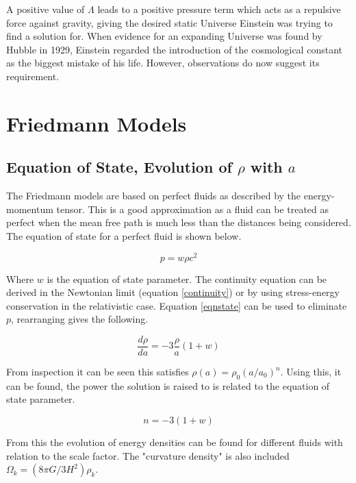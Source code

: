 \documentclass[12pt]{article} %
\begin{document}
A positive value of $\Lambda$ leads to a positive pressure term which acts as a repulsive force against gravity, giving the desired static Universe Einstein was trying to find a solution for. When evidence for an expanding Universe was found by Hubble in 1929, Einstein regarded the introduction of the cosmological constant as the biggest mistake of his life. However, observations do now suggest its requirement\cite{coles}.

\section{Friedmann Models}

\subsection{Equation of State, Evolution of $\rho$ with $a$}

The Friedmann models are based on perfect fluids as described by the energy-momentum tensor. This is a good approximation as a fluid can be treated as perfect when the mean free path is much less than the distances being considered\cite{coles}. The equation of state for a perfect fluid is shown below.

\begin{equation}\label{eqnstate}
p = w\rho c^2
\end{equation}

Where $w$ is the equation of state parameter\cite{carlo}. The continuity equation can be derived in the Newtonian limit (equation \ref{continuity}) or by using stress-energy conservation in the relativistic case. Equation \ref{eqnstate} can be used to eliminate $p$, rearranging gives the following.

\begin{equation}\label{eqnstatewithcont}
\frac{d\rho}{da} = -3\frac{\rho}{a}(1+w)
\end{equation}

From inspection it can be seen this satisfies $\rho(a) = \rho_{0}(a/a_{0})^n$. Using this, it can be found, the power the solution is raised to is related to the equation of state parameter\cite{carlo}. 

\begin{equation}
n = -3(1+w)
\end{equation}

From this the evolution of energy densities can be found for different fluids with relation to the scale factor. The "curvature density" is also included $\Omega_{k}=(8\pi G/3H^2)\rho_{k}$.
\end{document}
